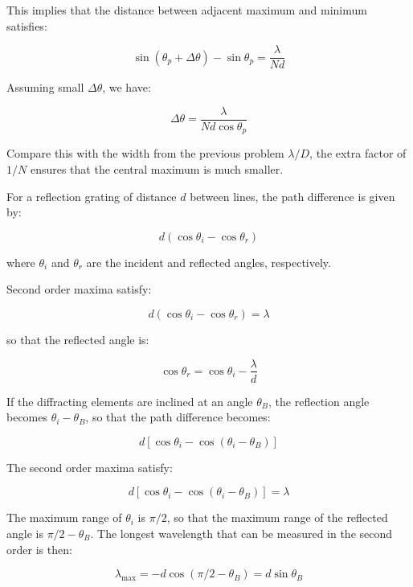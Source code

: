 \documentclass[12pt]{article}
\begin{document}
This implies that the distance between adjacent maximum and minimum satisfies:

\begin{equation}
    \sin{(\theta_{p} + \Delta \theta)} - \sin{\theta_{p}} = \frac{\lambda}{Nd}
\end{equation}

Assuming small $\Delta \theta$, we have:

\begin{equation}
    \Delta \theta = \frac{\lambda}{Nd \cos{\theta_{p}}}
\end{equation}

Compare this with the width from the previous problem $\lambda/D$, the extra factor of $1/N$ ensures that the central maximum is much smaller.




For a reflection grating of distance $d$ between lines, the path difference is given by:

\begin{equation}
    d (\cos{\theta_{i}} - \cos{\theta_{r}})
\end{equation}

where $\theta_{i}$ and $\theta_{r}$ are the incident and reflected angles, respectively.

Second order maxima satisfy:

\begin{equation}
    d (\cos{\theta_{i}} - \cos{\theta_{r}}) = \lambda
\end{equation}

so that the reflected angle is:

\begin{equation}
    \cos{\theta_{r}} = \cos{\theta_{i}} - \frac{\lambda}{d}
\end{equation}

If the diffracting elements are inclined at an angle $\theta_{B}$, the reflection angle becomes $\theta_{i} - \theta_{B}$, so that the path difference becomes:

\begin{equation}
    d [\cos{\theta_{i}} - \cos{(\theta_{i} - \theta_{B})}]
\end{equation}

The second order maxima satisfy:

\begin{equation}
    d [\cos{\theta_{i}} - \cos{(\theta_{i} - \theta_{B})}] = \lambda
\end{equation}

The maximum range of $\theta_{i}$ is $\pi/2$, so that the maximum range of the reflected angle is $\pi/2 - \theta_{B}$. The longest wavelength that can be measured in the second order is then:

\begin{equation}
    \lambda_{\text{max}} = -d \cos{(\pi/2 - \theta_{B})} = d \sin{\theta_{B}}
\end{equation}
\end{document}
